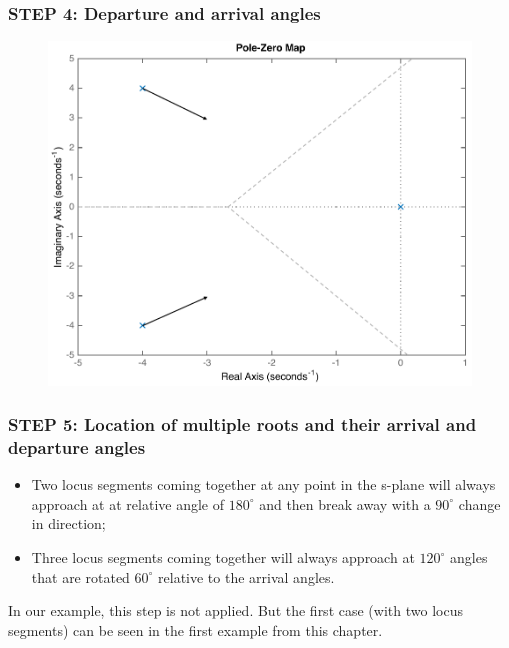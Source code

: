 \begin{frame}
\frametitle{STEP 4: Departure and arrival angles}	
	\begin{exampleblock}{}
		\begin{figure}
			\centering
			\includegraphics[width=0.7\linewidth]{how_to_draw_ex5}
		\end{figure}
	\end{exampleblock}
\end{frame}

\begin{frame}
\frametitle{STEP 5: Location of multiple roots and their arrival and departure angles}
\justify
	\begin{itemize}
	\item Two locus segments coming together at any point in the s-plane will always approach at at relative angle of $180^{\circ}$ and then break away with a $90^{\circ}$ change in direction; 
	\item Three locus segments coming together will always approach at $120^{\circ}$ angles that are rotated $60^{\circ}$ relative to the arrival angles.
	\end{itemize}
	\begin{exampleblock}{}
		In our example, this step is not applied. But the first case (with two locus segments) can be seen in the first example from this chapter. 
	\end{exampleblock}
\end{frame}

